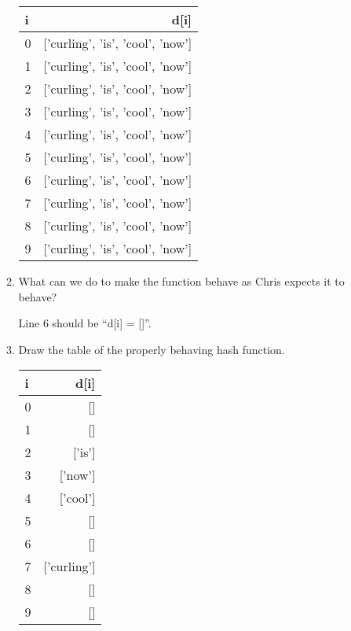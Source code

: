 \documentclass[11pt]{article}
\newenvironment{answer}{\large\lstset{basicstyle=\large}\color{white}}{}
\newenvironment{answer}{\large\lstset{basicstyle=\large}\color{red}}{}
\begin{document}
\begin{enumerate}
\begin{enumerate}
\begin{answer}
\begin{tabular}{l | r}
        	i & d[i] \\ \hline
    		0 & ['curling', 'is', 'cool', 'now'] \\ 
    		1 & ['curling', 'is', 'cool', 'now'] \\
    		2 & ['curling', 'is', 'cool', 'now'] \\
    		3 & ['curling', 'is', 'cool', 'now'] \\
    		4 & ['curling', 'is', 'cool', 'now'] \\
    		5 & ['curling', 'is', 'cool', 'now'] \\
    		6 & ['curling', 'is', 'cool', 'now'] \\
    		7 & ['curling', 'is', 'cool', 'now'] \\
    		8 & ['curling', 'is', 'cool', 'now'] \\
    		9 & ['curling', 'is', 'cool', 'now'] \\
    
    	    \end{tabular}
        \end{answer}

    \item What can we do to make the function behave as Chris expects it to
          behave?

        \begin{answer}
        Line 6 should be ``d[i] = []''.
        \end{answer}

    \item Draw the table of the properly behaving hash function.
        
        \begin{answer}
            \begin{tabular}{l | r}
    
        	i & d[i] \\ \hline
    		0 & [] \\ 
    		1 & [] \\
    		2 & ['is'] \\
    		3 & ['now'] \\
    		4 & ['cool'] \\
    		5 & [] \\
    		6 & [] \\
    		7 & ['curling'] \\
    		8 & [] \\
    		9 & [] \\
    
    	    \end{tabular}
        \end{answer}
    \end{enumerate}



\end{enumerate}
\end{document}
